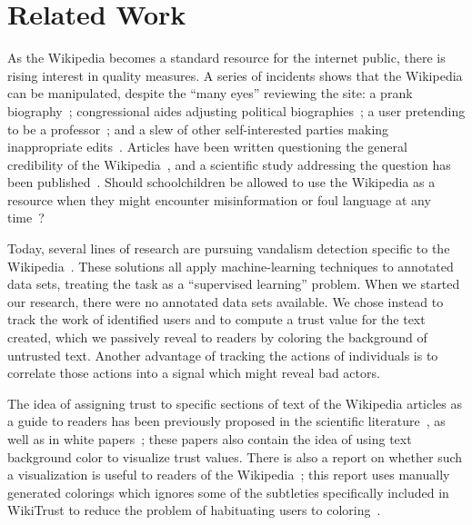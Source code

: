 \section{Related Work}

As the Wikipedia becomes a standard resource for the internet
public, there is rising interest in quality measures.
A series of incidents shows that the Wikipedia can be manipulated,
despite the ``many eyes'' reviewing the site:
a prank biography~\cite{Seigenthaler05,NewYorkTimes05a,NewYorkTimes05b};
congressional aides adjusting political
biographies~\cite{Lehmann2006,Hickman2006,Davis2006};
a user pretending to be a professor~\cite{BBC2007};
and a slew of other self-interested parties making
inappropriate edits~\cite{Wired07,Wikiscanner07,Noguchi2008}.
Articles have been written questioning the
general credibility of the Wikipedia~\cite{Stross2006,Schiff2006},
and a scientific study addressing the question
has been published~\cite{Giles2005}.
Should schoolchildren be allowed to use the Wikipedia as
a resource when they might encounter misinformation or foul
language at any time~\cite{Gralla2007,Olanoff2007}?

Today, several lines of research are pursuing
vandalism detection specific to the Wikipedia~\cite{Potthast2010b}.
These solutions all apply machine-learning techniques
to annotated data sets, treating the task as a
``supervised learning'' problem.
When we started our research, there were no annotated
data sets available.
We chose instead to track the work of identified users and to compute a
trust value for the text created, which we passively reveal to readers
by coloring the background of untrusted text.
Another advantage of tracking the actions of individuals is to correlate
those actions into a signal which might reveal bad actors.

The idea of assigning trust to specific sections of text of the Wikipedia
articles as a guide to readers has been previously proposed in the scientific
literature~\cite{WikiMTWtrust06,Cross2006,McGuinness06}, as well as in white
papers~\cite{King2007}; these papers also contain
the idea of using text background color to visualize trust values.
There is also a report on whether such a visualization is useful
to readers of the Wikipedia~\cite{Lucassen2011}; this report uses
manually generated colorings which ignores some of the subtleties
specifically included in WikiTrust to reduce the problem of
habituating users to coloring~\cite{Adler2007}.


